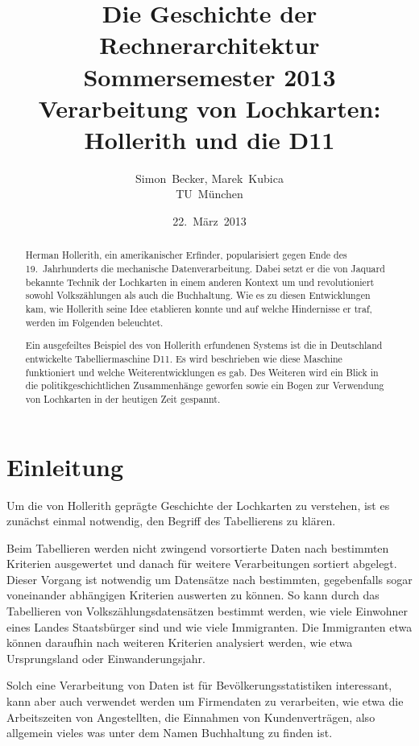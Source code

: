 \documentclass[parskip=half]{scrartcl}
\author{Simon~Becker, Marek~Kubica\\TU~München}
\title{Die Geschichte der Rechnerarchitektur\\
Sommersemester 2013\\
Verarbeitung von Lochkarten: Hollerith und die D11}
\date{22.~März~2013}
\begin{document}
\maketitle

\begin{abstract}

Herman Hollerith, ein amerikanischer Erfinder, popularisiert gegen Ende des
19.~Jahrhunderts die mechanische Datenverarbeitung. Dabei setzt er die von
Jaquard bekannte Technik der Lochkarten in einem anderen Kontext um und
revolutioniert sowohl Volkszählungen als auch die Buchhaltung. Wie es zu diesen
Entwicklungen kam, wie Hollerith seine Idee etablieren konnte und auf welche Hindernisse 
er traf, werden im Folgenden beleuchtet.

Ein ausgefeiltes Beispiel des von Hollerith erfundenen Systems ist die in
Deutschland entwickelte Tabelliermaschine D11. Es wird beschrieben wie diese Maschine funktioniert und welche Weiterentwicklungen es gab. 
Des Weiteren wird ein Blick in die politikgeschichtlichen
Zusammenhänge geworfen sowie ein Bogen zur Verwendung von Lochkarten in der
heutigen Zeit gespannt.

\end{abstract}

\section{Einleitung}
\label{sec:einleitung}

Um die von Hollerith geprägte Geschichte der Lochkarten zu verstehen, ist es
zunächst einmal notwendig, den Begriff des Tabellierens zu klären.

Beim Tabellieren werden nicht zwingend vorsortierte Daten nach bestimmten
Kriterien ausgewertet und danach für weitere Verarbeitungen sortiert abgelegt.
Dieser Vorgang ist notwendig um Datensätze nach bestimmten, gegebenfalls sogar
voneinander abhängigen Kriterien auswerten zu können. So kann durch das
Tabellieren von Volkszählungsdatensätzen bestimmt werden, wie viele Einwohner
eines Landes Staatsbürger sind und wie viele Immigranten. Die Immigranten etwa
können daraufhin nach weiteren Kriterien analysiert werden, wie etwa
Ursprungsland oder Einwanderungsjahr.

Solch eine Verarbeitung von Daten ist für Bevölkerungsstatistiken interessant,
kann aber auch verwendet werden um Firmendaten zu verarbeiten, wie etwa die
Arbeitszeiten von Angestellten, die Einnahmen von Kundenverträgen, also
allgemein vieles was unter dem Namen Buchhaltung zu finden ist.
\end{document}
